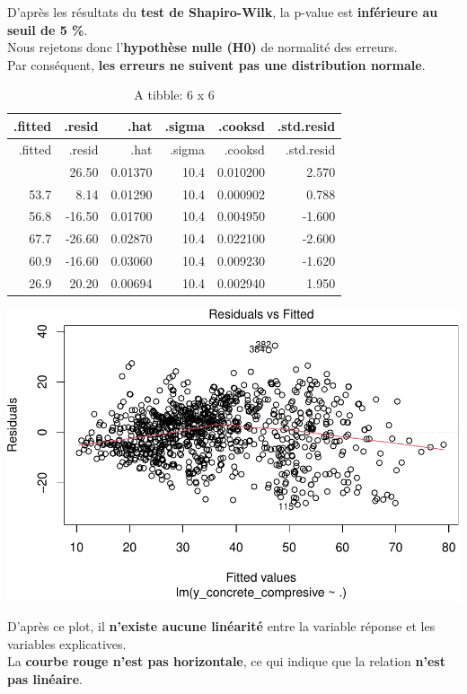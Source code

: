 \documentclass[
  12pt,
]{article}
\begin{document}
D'après les résultats du \textbf{test de Shapiro-Wilk}, la p-value est
\textbf{inférieure au seuil de 5 \%}.\\
Nous rejetons donc l'\textbf{hypothèse nulle (H0)} de normalité des
erreurs.\\
Par conséquent, \textbf{les erreurs ne suivent pas une distribution
normale}.

\begin{longtable}[]{@{}rrrrrr@{}}
\caption{A tibble: 6 x 6}\tabularnewline
\toprule\noalign{}
.fitted & .resid & .hat & .sigma & .cooksd & .std.resid \\
\midrule\noalign{}
\endfirsthead
\toprule\noalign{}
.fitted & .resid & .hat & .sigma & .cooksd & .std.resid \\
\midrule\noalign{}
\endhead
\bottomrule\noalign{}
\endlastfoot
53.5 & 26.50 & 0.01370 & 10.4 & 0.010200 & 2.570 \\
53.7 & 8.14 & 0.01290 & 10.4 & 0.000902 & 0.788 \\
56.8 & -16.50 & 0.01700 & 10.4 & 0.004950 & -1.600 \\
67.7 & -26.60 & 0.02870 & 10.4 & 0.022100 & -2.600 \\
60.9 & -16.60 & 0.03060 & 10.4 & 0.009230 & -1.620 \\
26.9 & 20.20 & 0.00694 & 10.4 & 0.002940 & 1.950 \\
\end{longtable}

\includegraphics{rmd_final_files/figure-latex/unnamed-chunk-35-1.pdf}

D'après ce plot, il \textbf{n'existe aucune linéarité} entre la variable
réponse et les variables explicatives.\\
La \textbf{courbe rouge n'est pas horizontale}, ce qui indique que la
relation \textbf{n'est pas linéaire}.
\end{document}
